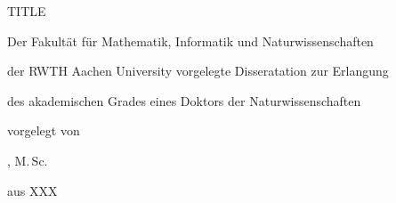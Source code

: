 
\begin{titlepage}%
  \setlength\parindent{0pt}%
  \centering%
  \null\vspace{8mm}%
  {\fontsize{17pt}{22pt}\selectfont%
  TITLE}\par
  \vspace{16mm}%
  \Large
  Der Fakultät für Mathematik, Informatik und Naturwissenschaften\par
  der RWTH Aachen University vorgelegte Disseratation zur Erlangung\par
  des akademischen Grades eines Doktors der Naturwissenschaften\par
  \vspace{32mm}%
  \large%
  vorgelegt von\par
  \vspace{3mm}%
  \LARGE%
  \theauthor, M.\,Sc.\par
  \vspace{4mm}%
  \large%
  aus XXX\par
\end{titlepage}

